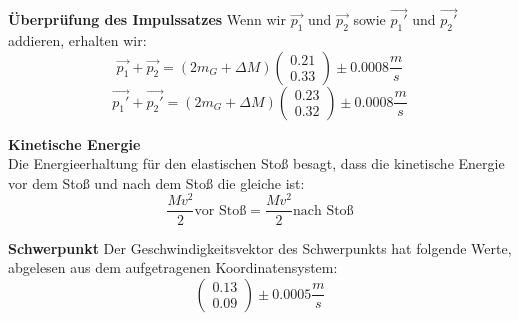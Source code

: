\documentclass{article}
\begin{document}
\textbf{Überprüfung des Impulssatzes}
Wenn wir $\vec{p_1}$ und $\vec{p_2}$ sowie $\vec{p_1'}$ und $\vec{p_2'}$ addieren, erhalten wir:
\begin{equation}\label{impuls1}
\vec{p_1}+\vec{p_2}=(2m_G+\Delta M )\begin{pmatrix}
0.21 \\ 0.33 
\end{pmatrix} \pm 0.0008  \frac{m}{s}
\end{equation}
\begin{equation}\label{impuls2}
\vec{p_1'} + \vec{p_2'} =(2m_G +\Delta M )\begin{pmatrix}
0.23 \\
0.32
\end{pmatrix} \pm 0.0008  \frac{m}{s}
\end{equation}


\textbf{Kinetische Energie}\\
Die Energieerhaltung für den elastischen Stoß besagt, dass die kinetische Energie vor dem Stoß und nach dem Stoß die gleiche ist:
\begin{equation}
\frac{Mv^2}{2} \text{vor Stoß} = \frac{Mv^2}{2}  \text{nach Stoß} 
\end{equation}


\textbf{Schwerpunkt}
Der Geschwindigkeitsvektor des Schwerpunkts hat folgende Werte, abgelesen aus dem aufgetragenen Koordinatensystem: 
\begin{equation}
\begin{pmatrix*}
0.13 \\ 0.09 
\end{pmatrix*} \pm 0.0005 \frac{m}{s} 
\end{equation}
\end{document}
